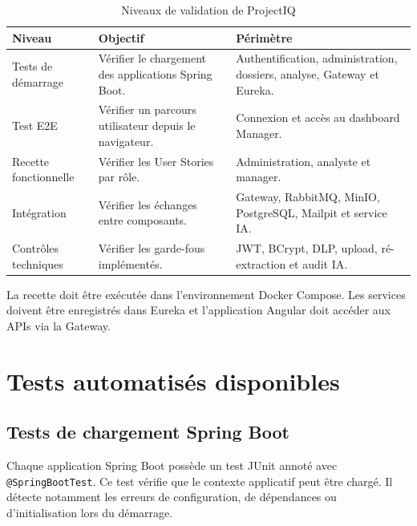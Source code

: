 \begin{table}[H]
\centering
\small
\caption{Niveaux de validation de ProjectIQ}
\label{tab:niveaux-validation}
\begin{tabularx}{\textwidth}{p{3cm}Y Y}
\toprule
\textbf{Niveau} & \textbf{Objectif} & \textbf{Périmètre} \\
\midrule
Tests de démarrage & Vérifier le chargement des applications Spring Boot. & Authentification, administration, dossiers, analyse, Gateway et Eureka. \\
Test E2E & Vérifier un parcours utilisateur depuis le navigateur. & Connexion et accès au dashboard Manager. \\
Recette fonctionnelle & Vérifier les User Stories par rôle. & Administration, analyste et manager. \\
Intégration & Vérifier les échanges entre composants. & Gateway, RabbitMQ, MinIO, PostgreSQL, Mailpit et service IA. \\
Contrôles techniques & Vérifier les garde-fous implémentés. & JWT, BCrypt, DLP, upload, ré-extraction et audit IA. \\
\bottomrule
\end{tabularx}
\end{table}

La recette doit être exécutée dans l'environnement Docker Compose. Les services doivent être enregistrés dans Eureka et l'application Angular doit accéder aux APIs via la Gateway.

\section{Tests automatisés disponibles}

\subsection{Tests de chargement Spring Boot}

Chaque application Spring Boot possède un test JUnit annoté avec \texttt{@SpringBootTest}. Ce test vérifie que le contexte applicatif peut être chargé. Il détecte notamment les erreurs de configuration, de dépendances ou d'initialisation lors du démarrage.

